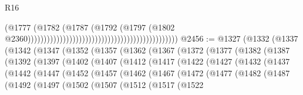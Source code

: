 \begin{lexlean}{R16}
\begin{coremodule}
                                                                                      (@1777
                                                                                        (@1782
                                                                                          (@1787
                                                                                            (@1792
                                                                                              (@1797
                                                                                                (@1802
                                                                                                  @2360)))))))))))))))))))))))))))))))))))))))))))))))
@2456 := @1327
    (@1332
      (@1337
        (@1342
          (@1347
            (@1352
              (@1357
                (@1362
                  (@1367
                    (@1372
                      (@1377
                        (@1382
                          (@1387
                            (@1392
                              (@1397
                                (@1402
                                  (@1407
                                    (@1412
                                      (@1417
                                        (@1422
                                          (@1427
                                            (@1432
                                              (@1437
                                                (@1442
                                                  (@1447
                                                    (@1452
                                                      (@1457
                                                        (@1462
                                                          (@1467
                                                            (@1472
                                                              (@1477
                                                                (@1482
                                                                  (@1487
                                                                    (@1492
                                                                      (@1497
                                                                        (@1502
                                                                          (@1507
                                                                            (@1512
                                                                              (@1517
                                                                                (@1522

\end{coremodule}
\end{lexlean}
